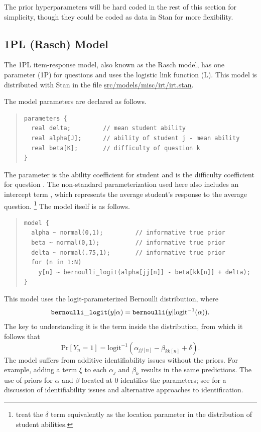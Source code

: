 The prior hyperparameters will be hard coded in the rest of this
section for simplicity, though they could be coded as data in
Stan for more flexibility.

\subsection{1PL (Rasch) Model}

The 1PL item-response model, also known as the Rasch model, has one
parameter (1P) for questions and uses the logistic link function (L).
This model is distributed with Stan in the file
\url{src/models/misc/irt/irt.stan}.

The model parameters are declared as follows.
%
\begin{quote}
\begin{Verbatim} 
parameters {    
  real delta;         // mean student ability
  real alpha[J];      // ability of student j - mean ability
  real beta[K];       // difficulty of question k
}
\end{Verbatim}
\end{quote}
%
The parameter  is the ability coefficient for student
 and  is the difficulty coefficient for question
.  The non-standard parameterization used here also includes
an intercept term , which represents the average student's
response to the average question.%
%
\footnote{\citep{GelmanHill:2007} treat the $\delta$ term equivalently
  as the location parameter in the distribution of student abilities.}
%
The model itself is as follows.
%
\begin{quote}
\begin{Verbatim} 
model {
  alpha ~ normal(0,1);         // informative true prior
  beta ~ normal(0,1);          // informative true prior
  delta ~ normal(.75,1);       // informative true prior
  for (n in 1:N)
    y[n] ~ bernoulli_logit(alpha[jj[n]] - beta[kk[n]] + delta);
}
\end{Verbatim}
\end{quote}
%
This model uses the logit-parameterized Bernoulli distribution, where
\[
{\tt bernoulli\_logit}(y|\alpha) =
{\tt bernoulli}(y|\mbox{logit}^{-1}(\alpha)).
\]
%
The key to understanding it is the term inside the
 distribution, from which it follows that
\[
\mbox{Pr}[Y_n = 1] = \mbox{logit}^{-1}(\alpha_{jj[n]} - \beta_{kk[n]}
+ \delta).
\]
%
The model suffers from additive identifiability issues without the
priors.  For example, adding a term $\xi$ to each $\alpha_j$ and
$\beta_k$ results in the same predictions.  The use of priors for
$\alpha$ and $\beta$ located at 0 identifies the parameters; see
\citep{GelmanHill:2007} for a discussion of identifiability issues and
alternative approaches to identification.  

